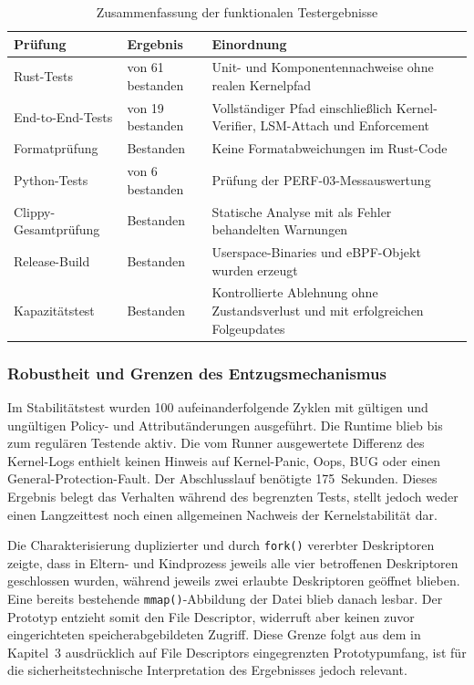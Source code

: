 \begin{table}[htbp]
    \centering

    \begin{tabular}{>{\raggedright\arraybackslash}p{}>{\raggedright\arraybackslash}p{}p{}}
        \hline
        \textbf{Prüfung} & \textbf{Ergebnis} & \textbf{Einordnung} \\
        \hline
        Rust-Tests & 61 von 61 bestanden & Unit- und Komponentennachweise ohne realen
        Kernelpfad \\
        End-to-End-Tests & 19 von 19 bestanden & Vollständiger Pfad einschließlich
        Kernel-Verifier, LSM-Attach und Enforcement \\
        Formatprüfung & Bestanden & Keine Formatabweichungen im Rust-Code \\
        Python-Tests & 6 von 6 bestanden & Prüfung der PERF-03-Messauswertung \\
        Clippy-Gesamtprüfung & Bestanden & Statische Analyse mit als Fehler behandelten
        Warnungen \\
        Release-Build & Bestanden & Userspace-Binaries und eBPF-Objekt wurden erzeugt \\
        Kapazitätstest & Bestanden & Kontrollierte Ablehnung ohne Zustandsverlust und mit
        erfolgreichen Folgeupdates \\
        \hline
    \end{tabular}
    \caption{Zusammenfassung der funktionalen Testergebnisse}
    \label{tab:funktionale-ergebnisse}
\end{table}

\subsubsection{Robustheit und Grenzen des Entzugsmechanismus}

Im Stabilitätstest wurden 100 aufeinanderfolgende Zyklen mit gültigen und ungültigen Policy- und
Attributänderungen ausgeführt. Die Runtime blieb bis zum regulären Testende aktiv. Die vom Runner
ausgewertete Differenz des Kernel-Logs enthielt keinen Hinweis auf Kernel-Panic, Oops, BUG oder
einen General-Protection-Fault. Der Abschlusslauf benötigte 175~Sekunden. Dieses Ergebnis
belegt das Verhalten während des begrenzten Tests, stellt jedoch weder einen Langzeittest noch
einen allgemeinen Nachweis der Kernelstabilität dar.

Die Charakterisierung duplizierter und durch \texttt{fork()} vererbter Deskriptoren zeigte, dass
in Eltern- und Kindprozess jeweils alle vier betroffenen Deskriptoren geschlossen wurden, während
jeweils zwei erlaubte Deskriptoren geöffnet blieben. Eine bereits bestehende
\texttt{mmap()}-Abbildung der Datei blieb danach lesbar. Der Prototyp entzieht somit den File
Descriptor, widerruft aber keinen zuvor eingerichteten speicherabgebildeten Zugriff. Diese Grenze
folgt aus dem in Kapitel~3 ausdrücklich auf File Descriptors eingegrenzten Prototypumfang, ist
für die sicherheitstechnische Interpretation des Ergebnisses jedoch relevant.

